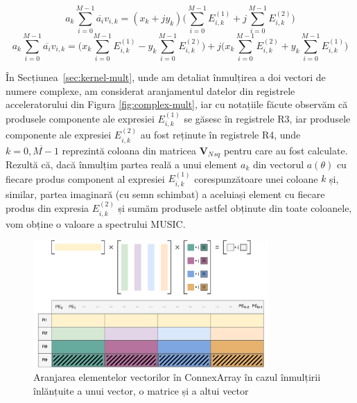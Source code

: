 \begin{equation}
  a_k\sum_{i=0}^{M-1} \overline{a_i}v_{i,k} = 
  (x_k + jy_k)
  \Bigg(
  \sum_{i=0}^{M-1} E_{i,k}^{(1)}+ j\sum_{i=0}^{M-1} E_{i,k}^{(2)}
  \Bigg)
\end{equation}
\begin{equation}
  a_k\sum_{i=0}^{M-1} \overline{a_i}v_{i,k} = 
  \Bigg(
  x_k \sum_{i=0}^{M-1} E_{i,k}^{(1)} - y_k \sum_{i=0}^{M-1} E_{i,k}^{(2)}
  \Bigg) + 
 j\Bigg(
  x_k \sum_{i=0}^{M-1} E_{i,k}^{(2)} + y_k \sum_{i=0}^{M-1} E_{i,k}^{(1)}
  \Bigg)
\end{equation} 

În Secțiunea~\ref{sec:kernel-mult}, unde am detaliat înmulțirea a doi vectori de
numere complexe, am considerat aranjamentul datelor din
registrele acceleratorului din Figura \ref{fig:complex-mult}, iar cu notațiile
făcute observăm că produsele componente ale expresiei $E_{i,k}^{(1)}$ se găsesc
în registrele R3, iar produsele componente ale expresiei $E_{i,k}^{(2)}$ au fost
reținute în registrele R4, unde $k = \overline{0, M-1}$ reprezintă coloana din
matricea $\bm{V}_N{_{sq}}$ pentru care au fost calculate. Rezultă că, dacă
înmulțim partea reală a unui element $a_k$ din vectorul $a(\theta)$ cu fiecare
produs component al expresiei $E_{i,k}^{(1)}$ corespunzătoare unei coloane $k$
și, similar, partea imaginară (cu semn schimbat) a aceluiași element cu fiecare
produs din expresia $E_{i,k}^{(2)}$ și sumăm produsele astfel obținute din toate
coloanele, vom obține o valoare a spectrului MUSIC. \\

\begin{figure}[h]
    \centering
    \includegraphics[width=0.8\textwidth]{src/img/mult-chained}
    \caption{Aranjarea elementelor vectorilor în ConnexArray în cazul înmulțirii
    înlănțuite a unui vector, o matrice și a altui vector}
    \label{fig:reg-mult-chain}
\end{figure}

